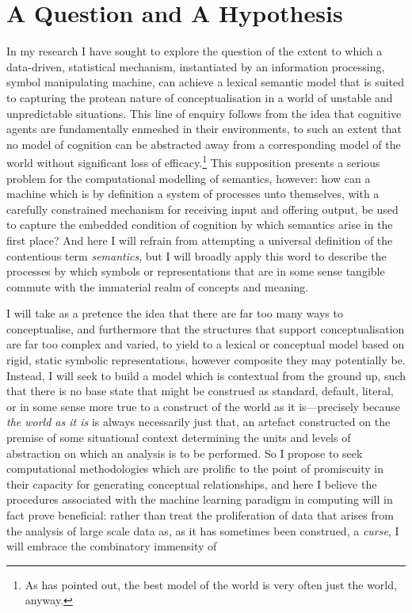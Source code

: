 \section{A Question and A Hypothesis}
In my research I have sought to explore the question of the extent to which a data-driven, statistical mechanism, instantiated by an information processing, symbol manipulating machine, can achieve a lexical semantic model that is suited to capturing the protean nature of conceptualisation in a world of unstable and unpredictable situations.  This line of enquiry follows from the idea that cognitive agents are fundamentally enmeshed in their environments, to such an extent that no model of cognition can be abstracted away from a corresponding model of the world without significant loss of efficacy.\footnote{As \cite{Brooks} has pointed out, the best model of the world is very often just the world, anyway.}  This supposition presents a serious problem for the computational modelling of semantics, however: how can a machine which is by definition a system of processes unto themselves, with a carefully constrained mechanism for receiving input and offering output, be used to capture the embedded condition of cognition by which semantics arise in the first place?  And here I will refrain from attempting a universal definition of the contentious term \emph{semantics}, but I will broadly apply this word to describe the processes by which symbols or representations that are in some sense tangible commute with the immaterial realm of concepts and meaning.

I will take as a pretence the idea that there are far too many ways to conceptualise, and furthermore that the structures that support conceptualisation are far too complex and varied, to yield to a lexical or conceptual model based on rigid, static symbolic representations, however composite they may potentially be.  Instead, I will seek to build a model which is contextual from the ground up, such that there is no base state that might be construed as standard, default, literal, or in some sense more true to a construct of the world as it is---precisely because \emph{the world as it is} is always necessarily just that, an artefact constructed on the premise of some situational context determining the units and levels of abstraction on which an analysis is to be performed.  So I propose to seek computational methodologies which are prolific to the point of promiscuity in their capacity for generating conceptual relationships, and here I believe the procedures associated with the machine learning paradigm in computing will in fact prove beneficial: rather than treat the proliferation of data that arises from the analysis of large scale data as, as it has sometimes been construed, a \emph{curse}, I will embrace the combinatory immensity of

